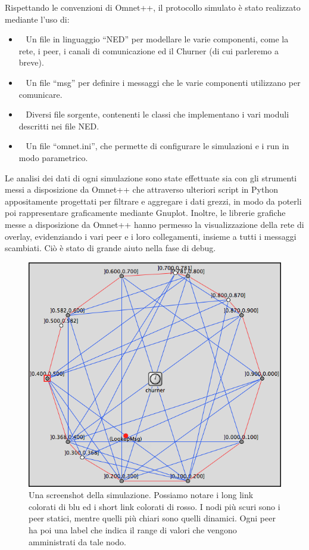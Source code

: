 \documentclass[prodmode,acmtap]{acmlarge}
\begin{document}
Rispettando le convenzioni di Omnet++, il protocollo simulato è stato realizzato mediante l'uso di:

\begin{itemize}
	\item ~ Un file in linguaggio ``NED'' per modellare le varie componenti, come la rete, i peer, i canali di comunicazione ed il Churner (di cui parleremo a breve).
	\item ~ Un file ``msg'' per definire i messaggi che le varie componenti utilizzano per comunicare.
	\item ~ Diversi file sorgente, contenenti le classi che implementano i vari moduli descritti nei file NED.
	\item ~ Un file ``omnet.ini'', che permette di configurare le simulazioni e i run in modo parametrico.
\end{itemize}

Le analisi dei dati di ogni simulazione sono state effettuate sia con gli strumenti messi a disposizione da Omnet++ che attraverso ulteriori script in Python appositamente progettati per filtrare e aggregare i dati grezzi, in modo da poterli poi rappresentare graficamente mediante Gnuplot. Inoltre, le librerie grafiche messe a disposizione da Omnet++ hanno permesso la visualizzazione della rete di overlay, evidenziando i vari peer e i loro collegamenti, insieme a tutti i messaggi scambiati. Ciò è stato di grande aiuto nella fase di debug.

\begin{figure}
\begin{center}
\includegraphics[scale=0.32]{imgs/screenshot.png}
\caption{Una screenshot della simulazione. Possiamo notare i long link colorati di blu ed i short link colorati di rosso. I nodi più scuri sono i peer statici, mentre quelli più chiari sono quelli dinamici. Ogni peer ha poi una label che indica il range di valori che vengono amministrati da tale nodo.}
\end{center}
\end{figure}
\end{document}
